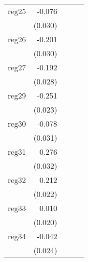 {\begin{longtable}{l*{4}{D{.}{.}{-1}}}
\addlinespace
reg25       &      -0.076\sym{*}  &                     &                     &                     \\
            &     (0.030)         &                     &                     &                     \\
\addlinespace
reg26       &      -0.201\sym{***}&                     &                     &                     \\
            &     (0.030)         &                     &                     &                     \\
\addlinespace
reg27       &      -0.192\sym{***}&                     &                     &                     \\
            &     (0.028)         &                     &                     &                     \\
\addlinespace
reg29       &      -0.251\sym{***}&                     &                     &                     \\
            &     (0.023)         &                     &                     &                     \\
\addlinespace
reg30       &      -0.078\sym{*}  &                     &                     &                     \\
            &     (0.031)         &                     &                     &                     \\
\addlinespace
reg31       &       0.276\sym{***}&                     &                     &                     \\
            &     (0.032)         &                     &                     &                     \\
\addlinespace
reg32       &       0.212\sym{***}&                     &                     &                     \\
            &     (0.022)         &                     &                     &                     \\
\addlinespace
reg33       &       0.010         &                     &                     &                     \\
            &     (0.020)         &                     &                     &                     \\
\addlinespace
reg34       &      -0.042         &                     &                     &                     \\
            &     (0.024)         &                     &                     &                     \\

\end{longtable}}
